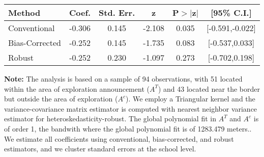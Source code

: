 \begin{table}[htbp]\centering
 \footnotesize 
\begin{tabular}{lccccc}
\hline\hline
Method & Coef. & Std. Err. & z & P$>|$z$|$ & [95\% C.I.] \\ 
\hline \hline  
Conventional & -0.306 & 0.145 & -2.108 & 0.035 & [-0.591,-0.022] \\ 
 Bias-Corrected & -0.252 & 0.145 & -1.735 & 0.083 & [-0.537,0.033] \\ 
Robust & -0.252 & 0.230 & -1.097 & 0.273 & [-0.702,0.198] \\ 
  \hline\hline
\end{tabular}
\label{table:rd}
\begin{tablenotes} 
  \justifying \tiny \textbf{Note: }    
   The analysis is based on a sample of 94 observations, with 51 located within the area of exploration announcement ($A^{T}$) and 43 located near the border but outside the area of exploration  ($A^{c}$). 
           We employ a Triangular kernel and the variance-covariance matrix estimator is computed with nearest neighbor variance estimator for heteroskedasticity-robust. The global polynomial fit in  $A^{T}$ and $A^{c}$ is of order 1, the bandwith where the global polynomial fit is of 1283.479 meters.. We estimate all coefficients using conventional, bias-corrected, and robust estimators, and we cluster standard errors at the school level. \end{tablenotes} 
 \end{table} 
